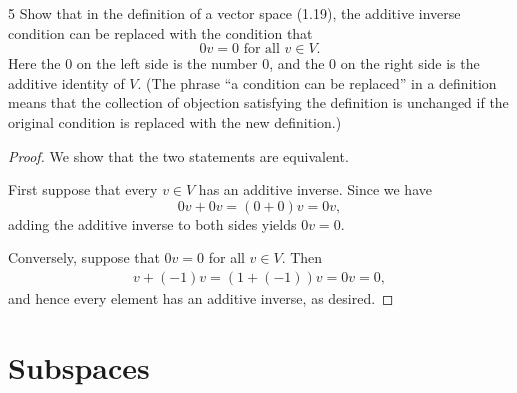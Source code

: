\documentclass{extarticle}
\newenvironment{problem}[1]{\begin{prob*}{#1}{}}{\end{prob*}}
\begin{document}
\begin{problem}{5}
Show that in the definition of a vector space (1.19), the additive inverse condition can be replaced with the condition that
\begin{equation*}
0v = 0 \text{ for all } v \in V.
\end{equation*}
Here the $0$ on the left side is the number $0$, and the $0$ on the right side is the additive identity of $V$.  (The phrase ``a condition can be replaced'' in a definition means that the collection of objection satisfying the definition is unchanged if the original condition is replaced with the new definition.)
\end{problem}
\begin{proof}
We show that the two statements are equivalent.  
\par First suppose that every $v\in V$ has an additive inverse.  Since we have
\begin{equation*}
0v + 0v = (0 + 0)v = 0v,
\end{equation*}
adding the additive inverse to both sides yields $0v = 0$.
\par Conversely, suppose that $0v = 0$ for all $v\in V$.  Then
\begin{align*}
v + (-1)v = (1 + (-1))v = 0v = 0,
\end{align*}
and hence every element has an additive inverse, as desired.
\end{proof}

\section{Subspaces}
\end{document}
